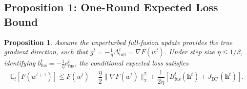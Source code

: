 \documentclass[5p,times]{elsarticle}
\theoremstyle{plain}
\newtheorem{proposition}[theorem]{Proposition}
\theoremstyle{definition}
\theoremstyle{remark}
\begin{document}
\subsection{Proposition 1: One-Round Expected Loss Bound}
\begin{proposition}
\label{prop:learning_bound}
Assume the unperturbed full-fusion update provides the true gradient direction, such that $g^t = -\frac{1}{\eta}\Delta_{\mathrm{full}}^t = \nabla F(w^t)$. Under step size $\eta \le 1/\beta$, identifying $b_{\mathrm{fus}}^t = -\frac{1}{\eta}e_{\mathrm{fus}}^t$, the conditional expected loss satisfies
\begin{equation}
\mathbb E_t[F(w^{t+1})] \le F(w^t) - \frac{\eta}{2}\|\nabla F(w^t)\|_2^2 + \frac{1}{2\eta}\left[ B_{\mathrm{fus}}^t(\mathbf h^t) + J_{\mathrm{DP}}(\mathbf h^t) \right].
\end{equation}
\end{proposition}
\end{document}

